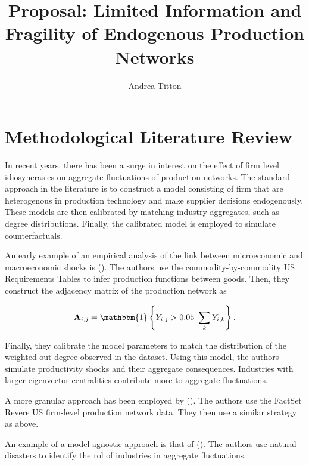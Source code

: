 \documentclass[american, abstract=on]{scrartcl}
\author{Andrea Titton}
\title{Proposal: Limited Information and Fragility of Endogenous Production Networks}
\newcommand{\citein}[1]{\citeauthor{#1} (\citeyear{#1})}
\begin{document}
\maketitle

\section{Methodological Literature Review}

In recent years, there has been a surge in interest on the effect of firm level idiosyncrasies on aggregate fluctuations of production networks. The standard approach in the literature is to construct a model consisting of firm that are heterogenous in production technology and make supplier decisions endogenously. These models are then calibrated by matching industry aggregates, such as degree distributions. Finally, the calibrated model is employed to simulate counterfactuals.

An early example of an empirical analysis of the link between microeconomic and macroeconomic shocks is \citein{carvalho_supply_2016}. The authors use the commodity-by-commodity US Requirements Tables to infer production functions between goods. Then, they construct the adjacency matrix of the production network as

\begin{equation*}
    \mathbf{A}_{i, j} = \mathbbm{1}\left\{ Y_{i, j} > 0.05 \ \sum_{k} Y_{i, k}  \right\}.
\end{equation*}

Finally, they calibrate the model parameters to match the distribution of the weighted out-degree observed in the dataset. Using this model, the authors simulate productivity shocks and their aggregate consequences. Industries with larger eigenvector centralities contribute more to aggregate fluctuations.

A more granular approach has been employed by \citein{mathieu_taschereau-dumouchel_cascades_2020}. The authors use the FactSet Revere US firm-level production network data. They then use a similar strategy as above.

An example of a model agnostic approach is that of \citein{barrot_input_2016}. The authors use natural disasters to identify the rol of industries in aggregate fluctuations.

\newpage
\nocite{*}
\printbibliography
\end{document}
